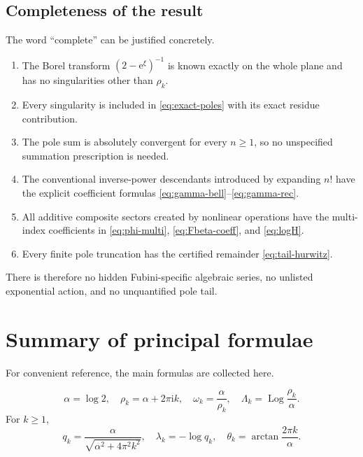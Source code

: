 \documentclass[11pt,a4paper]{article}
\theoremstyle{definition}
\theoremstyle{remark}
\newcommand{\e}{\mathrm e}
\newcommand{\ii}{\mathrm i}
\newcommand{\Log}{\operatorname{Log}}
\begin{document}
\subsection{Completeness of the result}

The word ``complete'' can be justified concretely.

\begin{enumerate}
\item The Borel transform \((2-\e^\xi)^{-1}\) is known exactly on the whole
      plane and has no singularities other than \(\rho_k\).
\item Every singularity is included in \eqref{eq:exact-poles} with its exact
      residue contribution.
\item The pole sum is absolutely convergent for every \(n\ge1\), so no
      unspecified summation prescription is needed.
\item The conventional inverse-power descendants introduced by expanding
      \(n!\) have the explicit coefficient formulas
      \eqref{eq:gamma-bell}--\eqref{eq:gamma-rec}.
\item All additive composite sectors created by nonlinear operations have the
      multi-index coefficients in \eqref{eq:phi-multi},
      \eqref{eq:Fbeta-coeff}, and \eqref{eq:logH}.
\item Every finite pole truncation has the certified remainder
      \eqref{eq:tail-hurwitz}.
\end{enumerate}

There is therefore no hidden Fubini-specific algebraic series, no unlisted
exponential action, and no unquantified pole tail.

\section{Summary of principal formulae}

For convenient reference, the main formulas are collected here.

\begin{notationbox}
\[
 \alpha=\log2,
 \quad \rho_k=\alpha+2\pi\ii k,
 \quad \omega_k=\frac{\alpha}{\rho_k},
 \quad \Lambda_k=\Log\frac{\rho_k}{\alpha}.
\]
For \(k\ge1\),
\[
 q_k=\frac{\alpha}{\sqrt{\alpha^2+4\pi^2k^2}},\quad
 \lambda_k=-\log q_k,\quad
 \theta_k=\arctan\frac{2\pi k}{\alpha}.
\]
\end{notationbox}
\end{document}

